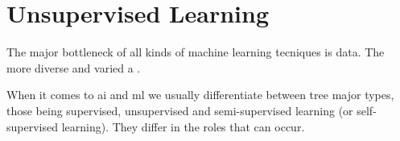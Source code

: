 \section{Unsupervised Learning}

The major bottleneck of all kinds of machine learning tecniques is data. The more diverse and varied a .

When it comes to \acrshort{ai} and \acrshort{ml} we usually differentiate between tree major types, those being supervised, unsupervised and semi-supervised learning (or self-supervised learning). They differ in the roles that can occur.


